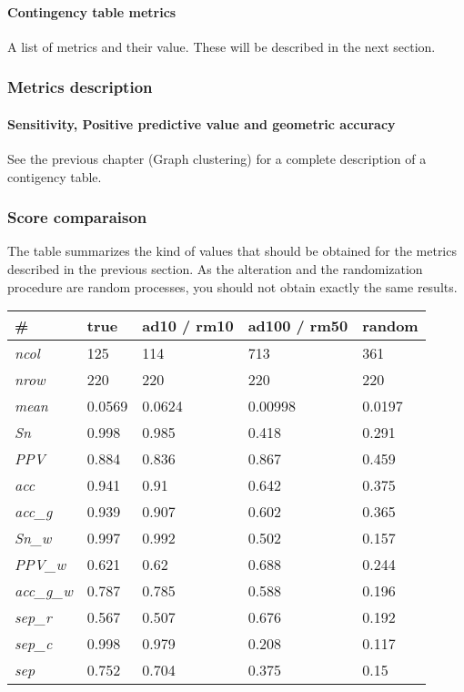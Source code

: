 \paragraph{Contingency table metrics}
 A list of metrics and their value. These will be described in the next section.

\subsubsection{Metrics description}

\paragraph{Sensitivity, Positive predictive value and geometric accuracy}
See the previous chapter (Graph clustering) for a complete description of a contigency table.


\subsubsection{Score comparaison}

The table summarizes the kind of values that should be obtained for the metrics described in the previous section. As the alteration and the randomization procedure are random processes, you should not obtain exactly the same results.

\begin{tabular}{|l|l|l|l|l|}
\hline
\# & \textbf{true }& \textbf{ad10 / rm10} & \textbf{ad100 / rm50} & \textbf{random} \\ \hline
\textit{ncol} & 125 & 114 & 713 & 361 \\ \hline
\textit{nrow} & 220 & 220 & 220 & 220 \\ \hline
\textit{mean} & 0.0569 & 0.0624 & 0.00998 & 0.0197 \\ \hline
\textit{Sn} & 0.998 & 0.985 & 0.418 & 0.291 \\ \hline
\textit{PPV} & 0.884 & 0.836 & 0.867 & 0.459 \\ \hline
\textit{acc} & 0.941 & 0.91 & 0.642 & 0.375 \\ \hline
\textit{acc\_g} & 0.939 & 0.907 & 0.602 & 0.365 \\ \hline
\textit{Sn\_w} & 0.997 & 0.992 & 0.502 & 0.157 \\ \hline
\textit{PPV\_w} & 0.621 & 0.62 & 0.688 & 0.244 \\ \hline
\textit{acc\_g\_w} & 0.787 & 0.785 & 0.588 & 0.196 \\ \hline
\textit{sep\_r} & 0.567 & 0.507 & 0.676 & 0.192 \\ \hline
\textit{sep\_c} & 0.998 & 0.979 & 0.208 & 0.117 \\ \hline
\textit{sep} & 0.752 & 0.704 & 0.375 & 0.15 \\ \hline
\end{tabular}



